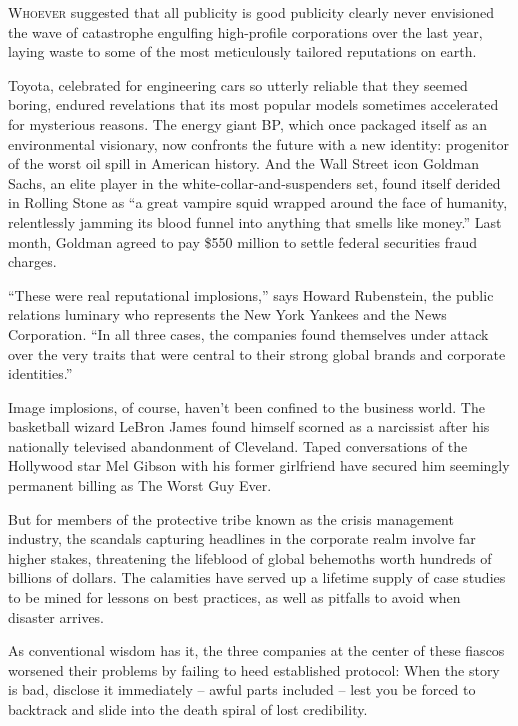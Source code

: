 ﻿\documentclass[12pt]{article}
\begin{document}
\lettrine{W}{hoever} suggested that all publicity is good publicity clearly
never envisioned the wave of catastrophe engulfing high-profile corporations over the last year,
laying waste to some of the most meticulously tailored reputations on earth.

Toyota, celebrated for engineering cars so utterly reliable that they seemed boring, endured
revelations that its most popular models sometimes accelerated for mysterious reasons. The energy
giant BP, which once packaged itself as an environmental visionary, now confronts the future with a
new identity: progenitor of the worst oil spill in American history. And the Wall Street icon
Goldman Sachs, an elite player in the white-collar-and-suspenders set, found itself derided in
Rolling Stone as ``a great vampire squid wrapped around the face of humanity, relentlessly jamming
its blood funnel into anything that smells like money.'' Last month, Goldman agreed to pay \$550
million to settle federal securities fraud charges.

``These were real reputational implosions,'' says Howard Rubenstein, the public relations luminary
who represents the New York Yankees and the News Corporation. ``In all three cases, the companies
found themselves under attack over the very traits that were central to their strong global brands
and corporate identities.''

Image implosions, of course, haven't been confined to the business world. The basketball wizard
LeBron James found himself scorned as a narcissist after his nationally televised abandonment of
Cleveland. Taped conversations of the Hollywood star Mel Gibson with his former girlfriend have
secured him seemingly permanent billing as The Worst Guy Ever.

But for members of the protective tribe known as the crisis management industry, the scandals
capturing headlines in the corporate realm involve far higher stakes, threatening the lifeblood of
global behemoths worth hundreds of billions of dollars. The calamities have served up a lifetime
supply of case studies to be mined for lessons on best practices, as well as pitfalls to avoid when
disaster arrives.

As conventional wisdom has it, the three companies at the center of these fiascos worsened their
problems by failing to heed established protocol: When the story is bad, disclose it immediately --
awful parts included -- lest you be forced to backtrack and slide into the death spiral of lost
credibility.
\end{document}
